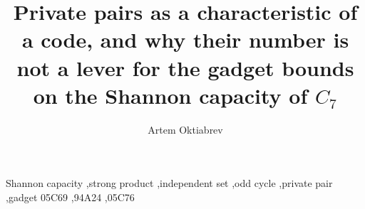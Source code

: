 \documentclass[preprint,12pt]{elsarticle}
\theoremstyle{definition}
\begin{document}
\begin{frontmatter}
\title{Private pairs as a characteristic of a code, and why their number is not a lever
for the gadget bounds on the Shannon capacity of $C_7$}
\author{Artem Oktiabrev}
\address{Independent researcher, Ukraine. ORCID 0009-0003-3626-2002}

\begin{abstract}

\end{abstract}

\begin{keyword}
Shannon capacity \sep strong product \sep independent set \sep odd cycle \sep private pair \sep gadget
\MSC[2020] 05C69 \sep 94A24 \sep 05C76
\end{keyword}
\end{frontmatter}





\end{document}
